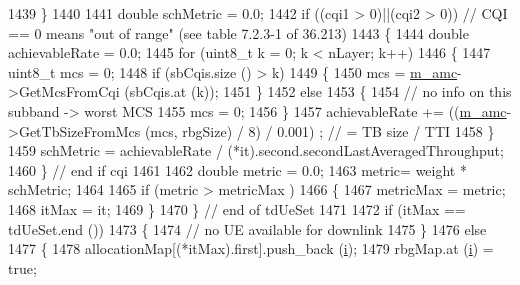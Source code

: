 \begin{DoxyCode}
1439                         \}
1440                 
1441                       \textcolor{keywordtype}{double} schMetric = 0.0;
1442                       \textcolor{keywordflow}{if} ((cqi1 > 0)||(cqi2 > 0)) \textcolor{comment}{// CQI == 0 means "out of range" (see table 7.2.3-1 of
       36.213)}
1443                         \{
1444                           \textcolor{keywordtype}{double} achievableRate = 0.0;
1445                           \textcolor{keywordflow}{for} (uint8\_t k = 0; k < nLayer; k++) 
1446                             \{
1447                               uint8\_t mcs = 0;
1448                               \textcolor{keywordflow}{if} (sbCqis.size () > k)
1449                                 \{                       
1450                                   mcs = \hyperlink{classns3_1_1PssFfMacScheduler_a0cbf5421430268701ab8a313ab912785}{m\_amc}->GetMcsFromCqi (sbCqis.at (k));
1451                                 \}
1452                               \textcolor{keywordflow}{else}
1453                                 \{
1454                                   \textcolor{comment}{// no info on this subband  -> worst MCS}
1455                                   mcs = 0;
1456                                 \}
1457                               achievableRate += ((\hyperlink{classns3_1_1PssFfMacScheduler_a0cbf5421430268701ab8a313ab912785}{m\_amc}->GetTbSizeFromMcs (mcs, rbgSize) / 8) / 0.001)
      ; \textcolor{comment}{// = TB size / TTI}
1458                             \}
1459                           schMetric = achievableRate / (*it).second.secondLastAveragedThroughput;
1460                         \}   \textcolor{comment}{// end if cqi}
1461          
1462                       \textcolor{keywordtype}{double} metric = 0.0;
1463                       metric= weight * schMetric;
1464          
1465                       \textcolor{keywordflow}{if} (metric > metricMax )
1466                         \{
1467                           metricMax = metric;
1468                           itMax = it;
1469                         \}
1470                     \} \textcolor{comment}{// end of tdUeSet}
1471 
1472                   \textcolor{keywordflow}{if} (itMax == tdUeSet.end ())
1473                     \{
1474                       \textcolor{comment}{// no UE available for downlink }
1475                     \}
1476                   \textcolor{keywordflow}{else}
1477                     \{
1478                       allocationMap[(*itMax).first].push\_back (\hyperlink{bernuolliDistribution_8m_a6f6ccfcf58b31cb6412107d9d5281426}{i});
1479                       rbgMap.at (\hyperlink{bernuolliDistribution_8m_a6f6ccfcf58b31cb6412107d9d5281426}{i}) = \textcolor{keyword}{true};

\end{DoxyCode}

